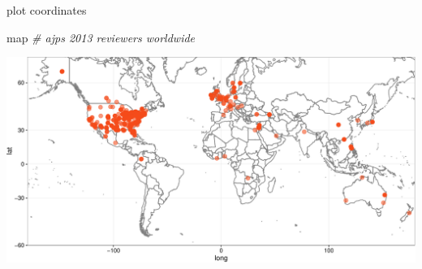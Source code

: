 \documentclass[ignorenonframetext,]{beamer}
\newenvironment{Shaded}{\begin{snugshade}}{\end{snugshade}}
\newcommand{\CommentTok}[1]{\textcolor[rgb]{0.56,0.35,0.01}{\textit{{#1}}}}
\newcommand{\NormalTok}[1]{{#1}}
\begin{document}
\begin{frame}[fragile]{plot coordinates}

\begin{Shaded}
\begin{Highlighting}[]
\NormalTok{map }\CommentTok{# ajps 2013 reviewers worldwide}
\end{Highlighting}
\end{Shaded}

\includegraphics{regex_case_files/figure-beamer/unnamed-chunk-21-1.pdf}

\end{frame}
\end{document}
